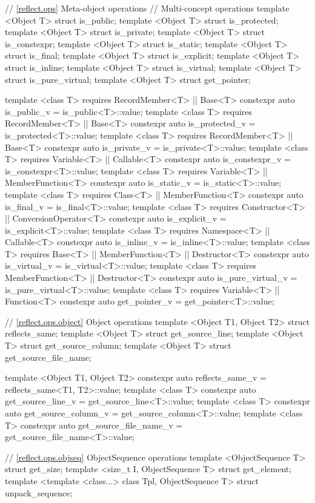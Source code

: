 \begin{std.txt}
\begin{codeblock}
{{// \ref{reflect.ops} Meta-object operations
// Multi-concept operations
template <Object T> struct is_public;
template <Object T> struct is_protected;
template <Object T> struct is_private;
template <Object T> struct is_constexpr;
template <Object T> struct is_static;
template <Object T> struct is_final;
template <Object T> struct is_explicit;
template <Object T> struct is_inline;
template <Object T> struct is_virtual;
template <Object T> struct is_pure_virtual;
template <Object T> struct get_pointer;

template <class T>
requires RecordMember<T> || Base<T>
  constexpr auto is_public_v = is_public<T>::value;
template <class T>
requires RecordMember<T> || Base<T>
  constexpr auto is_protected_v = is_protected<T>::value;
template <class T>
requires RecordMember<T> || Base<T>
  constexpr auto is_private_v = is_private<T>::value;
template <class T>
requires Variable<T> || Callable<T>
   constexpr auto is_constexpr_v = is_constexpr<T>::value;
template <class T>
requires Variable<T> || MemberFunction<T>
   constexpr auto is_static_v = is_static<T>::value;
template <class T>
requires Class<T> || MemberFunction<T>
   constexpr auto is_final_v = is_final<T>::value;
template <class T>
requires Constructor<T> || ConversionOperator<T>
   constexpr auto is_explicit_v = is_explicit<T>::value;
template <class T>
requires Namespace<T> || Callable<T>
   constexpr auto is_inline_v = is_inline<T>::value;
template <class T>
requires Base<T> || MemberFunction<T> || Destructor<T>
   constexpr auto is_virtual_v = is_virtual<T>::value;
template <class T>
requires MemberFunction<T> || Destructor<T>
   constexpr auto is_pure_virtual_v = is_pure_virtual<T>::value;
template <class T>
requires Variable<T> || Function<T>
   constexpr auto get_pointer_v = get_pointer<T>::value;

// \ref{reflect.ops.object} Object operations
template <Object T1, Object T2> struct reflects_same;
template <Object T> struct get_source_line;
template <Object T> struct get_source_column;
template <Object T> struct get_source_file_name;

template <Object T1, Object T2>
  constexpr auto reflects_same_v = reflects_same<T1, T2>::value;
template <class T>
  constexpr auto get_source_line_v = get_source_line<T>::value;
template <class T>
  constexpr auto get_source_column_v = get_source_column<T>::value;
template <class T>
  constexpr auto get_source_file_name_v = get_source_file_name<T>::value;

// \ref{reflect.ops.objseq} ObjectSequence operations
template <ObjectSequence T> struct get_size;
template <size_t I, ObjectSequence T> struct get_element;
template <template <class...> class Tpl, ObjectSequence T>
  struct unpack_sequence;

}}
\end{codeblock}
\end{std.txt}
